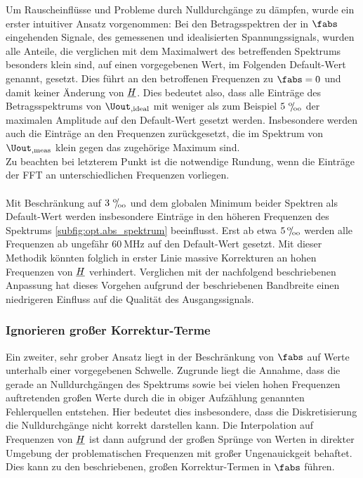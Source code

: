 \documentclass[../Report.tex]{subfiles}
\begin{document}
Um Rauscheinflüsse und Probleme durch Nulldurchgänge zu dämpfen, wurde ein erster intuitiver Ansatz vorgenommen: Bei den Betragsspektren der in $\fabs$ eingehenden Signale, des gemessenen und idealisierten Spannungssignals, wurden alle Anteile, die verglichen mit dem Maximalwert des betreffenden Spektrums besonders klein sind, auf einen vorgegebenen Wert, im Folgenden Default-Wert genannt, gesetzt. Dies führt an den betroffenen Frequenzen zu $\fabs = 0$ und damit keiner Änderung von $\underline{H}$.
Dies bedeutet also, dass alle Einträge des Betragsspektrums von $\Uout_{,\mathrm{ideal}}$ mit weniger als zum Beispiel $5 \, \, {}^\text{o}\mkern-5mu/\mkern-3mu_\text{oo} $ der maximalen Amplitude auf den Default-Wert gesetzt werden. Insbesondere werden auch die Einträge an den Frequenzen zurückgesetzt, die im Spektrum von $\Uout_{,\mathrm{meas}}$ klein gegen das zugehörige Maximum sind.
\\
Zu beachten bei letzterem Punkt ist die notwendige Rundung, wenn die Einträge der FFT an unterschiedlichen Frequenzen vorliegen. 
\\
\\
\noindent
Mit Beschränkung auf $3 \, \, {}^\text{o}\mkern-5mu/\mkern-3mu_\text{oo}$ und dem globalen Minimum beider Spektren als Default-Wert werden insbesondere Einträge in den höheren Frequenzen des Spektrums \ref{subfig:opt.abs_spektrum} beeinflusst. Erst ab etwa $5 \, {}^\text{o}\mkern-5mu/\mkern-3mu_\text{oo}$ werden alle Frequenzen ab ungefähr $\SI{60}{\MHz}$ auf den Default-Wert gesetzt. Mit dieser Methodik könnten folglich in erster Linie massive Korrekturen an hohen Frequenzen von $\underline{H}$ verhindert.
Verglichen mit der nachfolgend beschriebenen Anpassung hat dieses Vorgehen aufgrund der beschriebenen Bandbreite einen niedrigeren Einfluss auf die Qualität des Ausgangssignals.


\subsubsection*{Ignorieren großer Korrektur-Terme}
\label{subsubsec:opt.H.RMS}

Ein zweiter, sehr grober Ansatz liegt in der Beschränkung von $\fabs$ auf Werte unterhalb einer vorgegebenen Schwelle. Zugrunde liegt die Annahme, dass die gerade an Nulldurchgängen des Spektrums sowie bei vielen hohen Frequenzen auftretenden großen Werte durch die in obiger Aufzählung genannten Fehlerquellen entstehen. Hier bedeutet dies insbesondere, dass die Diskretisierung die Nulldurchgänge nicht korrekt darstellen kann. Die Interpolation auf Frequenzen von $\underline{H}$ ist dann aufgrund der großen Sprünge von Werten in direkter Umgebung der problematischen Frequenzen mit großer Ungenauickgeit behaftet. Dies kann zu den beschriebenen, großen Korrektur-Termen in $\fabs$ führen.
\end{document}

